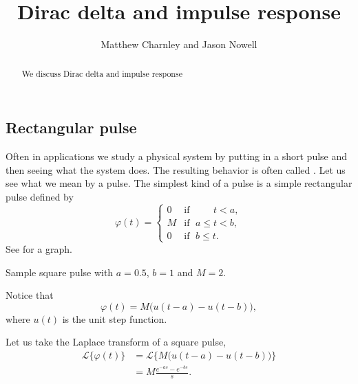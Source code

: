 \documentclass{ximera}
\title{Dirac delta and impulse response}
\author{Matthew Charnley and Jason Nowell}
\begin{document}
\begin{abstract}
    We discuss Dirac delta and impulse response
\end{abstract}
\maketitle


\label{diracdelta:section}




\subsection{Rectangular pulse}

Often in applications we study a physical system by putting in a short pulse and then seeing what the system does.  The resulting behavior is often called \emph{}. Let us see what we mean by a pulse. The simplest kind of a pulse is a simple rectangular pulse defined by
\begin{equation*}
    \varphi(t) = 
    \begin{cases}
        0 & \text{if } \; \phantom{a \leq {}} t < a , \\
        M & \text{if } \; a \leq t < b , \\
        0 & \text{if } \; b \leq t .
    \end{cases}
\end{equation*}
See  for a graph.

\begin{mywrapfig}[15]{3.25in}
    \capstart
    \caption{Sample square pulse with $a=0.5$, $b=1$ and $M = 2$.\label{lt:sqpulse}}
\end{mywrapfig}

Notice that
\begin{equation*}
    \varphi(t) = M \bigl( u(t-a) - u(t-b) \bigr) ,
\end{equation*}
where $u(t)$ is the unit step function.

Let us take the Laplace transform of a square pulse,
\begin{equation*}
    \begin{split}
        {\mathcal{L}} \bigl\{ \varphi(t) \bigr\}
        & = {\mathcal{L}} \bigl\{ M \bigl( u(t-a) - u(t-b) \bigr)  \bigr\}\\
        & = M \frac{e^{-as} - e^{-bs}}{s} .
    \end{split}
\end{equation*}
\end{document}
